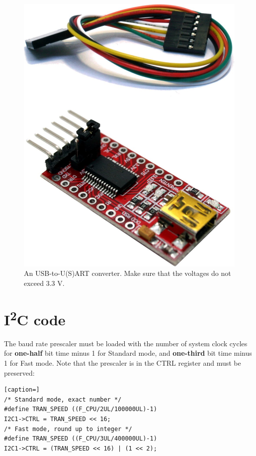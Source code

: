 \documentclass[12pt]{article}
\begin{document}
\begin{figure}[!ht]
\centering
\includegraphics[scale=0.1]{images/usb-usart-ttl}
\caption{An USB-to-U(S)ART converter. Make sure that the voltages do not exceed 3.3 V.}
\label{fig:usb-usart-ttl}
\end{figure}


\section{I\textsuperscript{2}C code}
The baud rate prescaler must be loaded with the number of system clock cycles for \textbf{one-half} bit time minus 1 for Standard mode, and \textbf{one-third} bit time minus 1 for Fast mode. Note that the prescaler is in the CTRL register and must be preserved:

\begin{lstlisting}[caption=]
/* Standard mode, exact number */
#define TRAN_SPEED ((F_CPU/2UL/100000UL)-1)
I2C1->CTRL = TRAN_SPEED << 16;
/* Fast mode, round up to integer */
#define TRAN_SPEED ((F_CPU/3UL/400000UL)-1)
I2C1->CTRL = (TRAN_SPEED << 16) | (1 << 2);
\end{lstlisting} 
\end{document}
